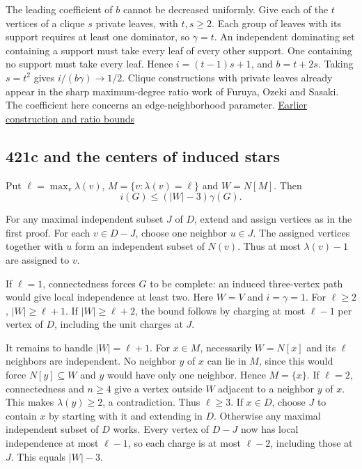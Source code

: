 \documentclass[11pt]{article}
\begin{document}
The leading coefficient of \(b\) cannot be decreased uniformly. Give each of the \(t\) vertices of a clique \(s\) private leaves, with \(t,s\ge2\). Each group of leaves with its support requires at least one dominator, so \(\gamma=t\). An independent dominating set containing a support must take every leaf of every other support. One containing no support must take every leaf. Hence \(i=(t-1)s+1\), and \(b=t+2s\). Taking \(s=t^2\) gives \(i/(b\gamma)\to1/2\). Clique constructions with private leaves already appear in the sharp maximum-degree ratio work of Furuya, Ozeki and Sasaki. The coefficient here concerns an edge-neighborhood parameter. \href{https://tgt.ynu.ac.jp/ozeki/2013FOS.pdf}{Earlier construction and ratio bounds}

\subsection{421c and the centers of induced stars}\label{c-and-the-centers-of-induced-stars}

Put \(\ell=\max_v\lambda(v)\), \(M=\{v:\lambda(v)=\ell\}\) and \(W=N[M]\). Then
\[i(G)\le (|W|-3)\gamma(G).\]

For any maximal independent subset \(J\) of \(D\), extend and assign vertices as in the first proof. For each \(v\in D-J\), choose one neighbor \(u\in J\). The assigned vertices together with \(u\) form an independent subset of \(N(v)\). Thus at most \(\lambda(v)-1\) are assigned to \(v\).

If \(\ell=1\), connectedness forces \(G\) to be complete: an induced three-vertex path would give local independence at least two. Here \(W=V\) and \(i=\gamma=1\). For \(\ell\ge2\), \(|W|\ge\ell+1\). If \(|W|\ge\ell+2\), the bound follows by charging at most \(\ell-1\) per vertex of \(D\), including the unit charges at \(J\).

It remains to handle \(|W|=\ell+1\). For \(x\in M\), necessarily \(W=N[x]\) and its \(\ell\) neighbors are independent. No neighbor \(y\) of \(x\) can lie in \(M\), since this would force \(N[y]\subseteq W\) and \(y\) would have only one neighbor. Hence \(M=\{x\}\). If \(\ell=2\), connectedness and \(n\ge4\) give a vertex outside \(W\) adjacent to a neighbor \(y\) of \(x\). This makes \(\lambda(y)\ge2\), a contradiction. Thus \(\ell\ge3\). If \(x\in D\), choose \(J\) to contain \(x\) by starting with it and extending in \(D\). Otherwise any maximal independent subset of \(D\) works. Every vertex of \(D-J\) now has local independence at most \(\ell-1\), so each charge is at most \(\ell-2\), including those at \(J\). This equals \(|W|-3\).
\end{document}
